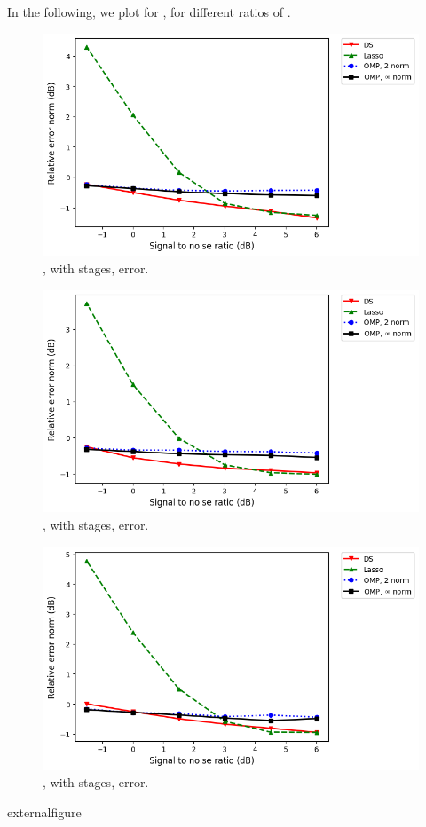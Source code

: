 In the following, we plot for , for different ratios of .
%
\begin {figure} [H]
\includegraphics [width = 0.8 \textwidth] {error-medium-equal-square-six-usual.png}
\caption {, with  stages, error.}
\end {figure}
%
\begin {figure} [H]
\includegraphics [width = 0.8 \textwidth] {error-medium-equal-wide-six-usual.png}
\caption {, with  stages, error.}
\end {figure}
%
\begin {figure} [H]
\includegraphics [width = 0.8 \textwidth] {error-medium-equal-tall-six-usual.png}
\caption {, with  stages, error.}
\end {figure}externalfigure

